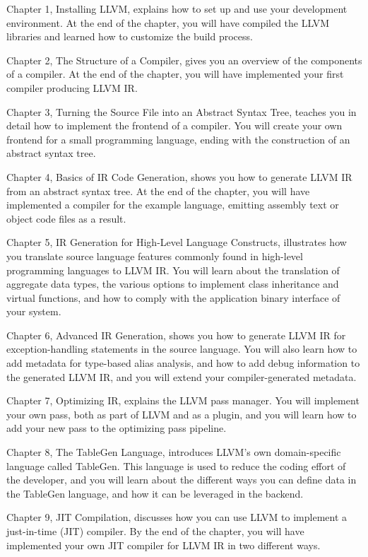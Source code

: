 Chapter 1, Installing LLVM, explains how to set up and use your development environment. At the end of the chapter, you will have compiled the LLVM libraries and learned how to customize the build process.

Chapter 2, The Structure of a Compiler, gives you an overview of the components of a compiler. At the end of the chapter, you will have implemented your first compiler producing LLVM IR.

Chapter 3, Turning the Source File into an Abstract Syntax Tree, teaches you in detail how to implement the frontend of a compiler. You will create your own frontend for a small programming language, ending with the construction of an abstract syntax tree.

Chapter 4, Basics of IR Code Generation, shows you how to generate LLVM IR from an abstract syntax tree. At the end of the chapter, you will have implemented a compiler for the example language, emitting assembly text or object code files as a result.

Chapter 5, IR Generation for High-Level Language Constructs, illustrates how you translate source language features commonly found in high-level programming languages to LLVM IR. You will learn about the translation of aggregate data types, the various options to implement class inheritance and virtual functions, and how to comply with the application binary interface of your system.

Chapter 6, Advanced IR Generation, shows you how to generate LLVM IR for exception-handling statements in the source language. You will also learn how to add metadata for type-based alias analysis, and how to add debug information to the generated LLVM IR, and you will extend your compiler-generated metadata.

Chapter 7, Optimizing IR, explains the LLVM pass manager. You will implement your own pass, both as part of LLVM and as a plugin, and you will learn how to add your new pass to the optimizing pass pipeline.

Chapter 8, The TableGen Language, introduces LLVM’s own domain-specific language called TableGen. This language is used to reduce the coding effort of the developer, and you will learn about the different ways you can define data in the TableGen language, and how it can be leveraged in the backend.

Chapter 9, JIT Compilation, discusses how you can use LLVM to implement a just-in-time (JIT) compiler. By the end of the chapter, you will have implemented your own JIT compiler for LLVM IR in two different ways.

